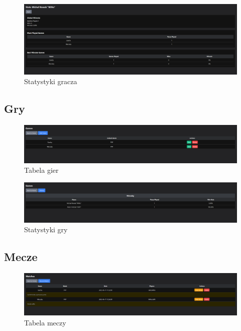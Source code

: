 \documentclass[12pt,a4paper]{article}
\begin{document}
\begin{enumerate}
\begin{figure}[H]
	\centering
	\includegraphics[width=1\linewidth]{media/4.png}
	\caption{Statystyki gracza}
	\label{fig:statystykigracza}
\end{figure}

\subsection{Gry}

\begin{figure}[H]
	\centering
	\includegraphics[width=1\linewidth]{media/2.png}
	\caption{Tabela gier}
	\label{fig:tabelagier}
\end{figure}

\begin{figure}[H]
	\centering
	\includegraphics[width=1\linewidth]{media/5.png}
	\caption{Statystyki gry}
	\label{fig:statystykigry}
\end{figure}

\subsection{Mecze}

\begin{figure}[H]
	\centering
	\includegraphics[width=1\linewidth]{media/3.png}
	\caption{Tabela meczy}
	\label{fig:tabelameczy}
\end{figure}


\end{enumerate}
\end{document}
